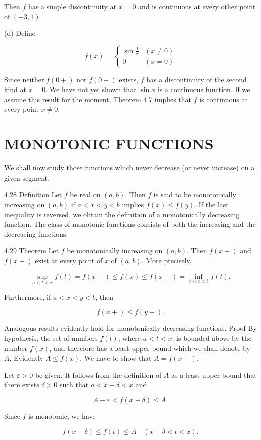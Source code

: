 \documentclass[10pt]{article}
\begin{document}
Then $f$ has a simple discontinuity at $x=0$ and is continuous at every other point of $(-3,1)$.

(d) Define

$$
f(x)= \begin{cases}\sin \frac{1}{x} & (x \neq 0) \\ 0 & (x=0)\end{cases}
$$

Since neither $f(0+)$ nor $f(0-)$ exists, $f$ has a discontinuity of the second kind at $x=0$. We have not yet shown that $\sin x$ is a continuous function. If we assume this result for the moment, Theorem 4.7 implies that $f$ is continuous at every point $x \neq 0$.

\section{MONOTONIC FUNCTIONS}
We shall now study those functions which never decrease (or never increase) on a given segment.

4.28 Definition Let $f$ be real on $(a, b)$. Then $f$ is said to be monotonically increasing on $(a, b)$ if $a<x<y<b$ implies $f(x) \leq f(y)$. If the last inequality is reversed, we obtain the definition of a monotonically decreasing function. The class of monotonic functions consists of both the increasing and the decreasing functions.

4.29 Theorem Let $f$ be monotonically increasing on $(a, b)$. Then $f(x+)$ and $f(x-)$ exist at every point of $x$ of $(a, b)$. More precisely,

$$
\sup _{a<t<x} f(t)=f(x-) \leq f(x) \leq f(x+)=\inf _{x<t<b} f(t) .
$$

Furthermore, if $a<x<y<b$, then

$$
f(x+) \leq f(y-) .
$$

Analogous results evidently hold for monotonically decreasing functions. Proof By hypothesis, the set of numbers $f(t)$, where $a<t<x$, is bounded above by the number $f(x)$, and therefore has a least upper bound which we shall denote by $A$. Evidently $A \leq f(x)$. We have to show that $A=f(x-)$.

Let $\varepsilon>0$ be given. It follows from the definition of $A$ as a least upper bound that there exists $\delta>0$ such that $a<x-\delta<x$ and

$$
A-\varepsilon<f(x-\delta) \leq A .
$$

Since $f$ is monotonic, we have

$$
f(x-\delta) \leq f(t) \leq A \quad(x-\delta<t<x) .
$$
\end{document}

